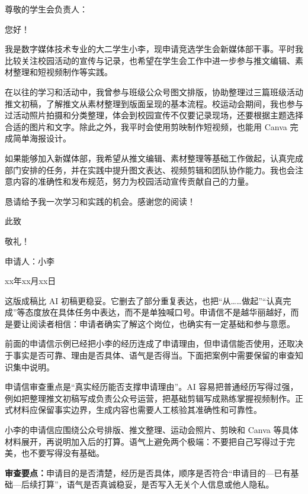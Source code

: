 \begin{aibox}
\noindent 尊敬的学生会负责人：

\par\qquad 您好！

\par\qquad 我是数字媒体技术专业的大二学生小李，现申请竞选学生会新媒体部干事。平时我比较关注校园活动的宣传与记录，也希望在学生会工作中进一步参与推文编辑、素材整理和短视频制作等实践。

\par\qquad 在以往的学习和活动中，我曾参与班级公众号图文排版，协助整理过三篇班级活动推文初稿，了解推文从素材整理到版面呈现的基本流程。校运动会期间，我也参与过活动照片拍摄和分类整理，体会到校园宣传不仅要记录现场，还要根据主题选择合适的图片和文字。除此之外，我平时会使用剪映制作短视频，也能用 Canva 完成简单海报设计。

\par\qquad 如果能够加入新媒体部，我希望从推文编辑、素材整理等基础工作做起，认真完成部门安排的任务，并在实践中提升图文表达、视频剪辑和团队协作能力。我也会注意内容的准确性和发布规范，努力为校园活动宣传贡献自己的力量。

\par\qquad 恳请给予我一次学习和实践的机会。感谢您的阅读！

\par\qquad 此致

\noindent 敬礼！

\par\hfill 申请人：小李

\par\hfill xx年xx月xx日
\end{aibox}

这版成稿比 AI 初稿更稳妥。它删去了部分重复表达，也把“从……做起”“认真完成”等态度放在具体任务中表达，而不是单独喊口号。申请信不是越华丽越好，而是要让阅读者相信：申请者确实了解这个岗位，也确实有一定基础和参与意愿。

前面的申请信示例已经把小李的经历连成了申请理由，但申请信能否使用，还取决于事实是否可靠、理由是否具体、语气是否得当。下面把案例中需要保留的审查知识集中说明。

\begin{critiquebox}
申请信审查重点是“真实经历能否支撑申请理由”。AI 容易把普通经历写得过强，例如把整理推文初稿写成负责公众号运营，把基础剪辑写成熟练掌握视频制作。正式材料应保留事实边界，生成内容也需要人工核验其准确性和可靠性\footnotemark。

小李的申请信应围绕公众号排版、推文整理、运动会照片、剪映和 Canva 等具体材料展开，再说明加入后的打算。语气上避免两个极端：不要把自己写得过于完美，也不要写得没有基础。

\textbf{审查要点：}申请目的是否清楚，经历是否具体，顺序是否符合“申请目的—已有基础—后续打算”，语气是否真诚稳妥，是否写入无关个人信息或他人隐私。
\end{critiquebox}
\addtocounter{footnote}{-1}



